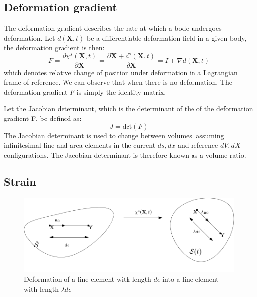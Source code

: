 \subsection{Deformation gradient}
The deformation gradient describes the rate at which a bode undergoes deformation.
Let $d(\textbf{X},t)$ be a differentiable deformation field in a given body, the deformation gradient is then:  
\begin{equation}
\label{eq:deformation_gradient}
F = \frac{\partial \chi^s(\textbf{X},t)}{\partial \textbf{X}} = \frac{\partial \textbf{X}  + d^s(\textbf{X} ,t) }{\partial \textbf{X}} =  I + \nabla d(\textbf{X},t) 
\end{equation}
which denotes relative change of position under deformation in a Lagrangian frame of reference. We can observe that when there is no deformation. The deformation gradient $F$ is simply the identity matrix. \newline

Let the Jacobian determinant, which is the determinant of the of the deformation gradient F, be defined as:
\begin{equation}\label{eq:J}
J = \text{det}(F)
\end{equation}
The Jacobian determinant is used to change between volumes, assuming infinitesimal line and area elements in the current $ds, dx$ and reference $dV,dX$ configurations. The Jacobian determinant is therefore known as a volume ratio.

\subsection{Strain}
\begin{figure}[H]
\includegraphics[scale=0.40]{./Solid_equations/Strain.png}
\caption{Deformation of a line element with length $d\epsilon$ into a line element with length $\lambda d \epsilon$}
\end{figure}


